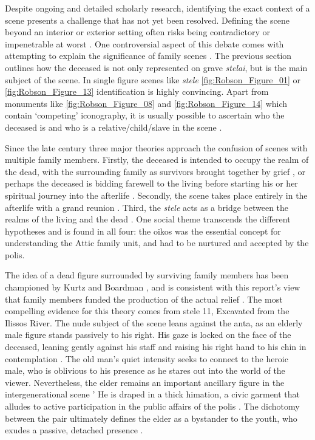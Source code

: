 
Despite ongoing and detailed scholarly research, identifying the exact context of a scene presents a challenge that has not yet been resolved. Defining the scene beyond an interior or exterior setting often risks being contradictory or impenetrable at worst \parencite[53]{Friis1951}.
One controversial aspect of this debate comes with attempting to explain the significance of family scenes \parencite[26]{Stears2000a}.
The previous section outlines how the deceased is not only represented on grave \textit{stelai}, but is the main subject of the scene. In single figure scenes like \textit{stele} \ref{fig:Robson_Figure_01} or \ref{fig:Robson_Figure_13} identification is highly convincing.
Apart from monuments like \ref{fig:Robson_Figure_08} and \ref{fig:Robson_Figure_14} which contain \enquote*{competing} iconography, it is usually possible to ascertain who the deceased is and who is a relative/child/slave in the scene \parencite[175]{Frel1973}.

Since the late  century three major theories approach the confusion of scenes with multiple family members. Firstly, the deceased is intended to occupy the realm of the dead, with the surrounding family as survivors brought together by grief \parencite[116]{Boardman1995},
or perhaps the deceased is bidding farewell to the living before starting his or her spiritual journey into the afterlife \parencite[116]{Boardman1995}.
Secondly, the scene takes place entirely in the afterlife with a grand reunion \parencite[247]{Mee2011}.
Third, the \textit{stele} acts as a bridge between the realms of the living and the dead \parencite[198]{Wasserman1969}. One social theme transcends the different hypotheses and is found in all four: the oikos was the essential concept for understanding the Attic family unit, and had to be nurtured and accepted by the polis.

The idea of a dead figure surrounded by surviving family members has been championed by Kurtz and Boardman \parencite[140]{Kurtz1971},
and is consistent with this report’s view that family members funded the production of the actual relief \parencite[96]{Wrenhaven2012}.
The most compelling evidence for this theory comes from stele 11, Excavated from the Ilissos River. The nude subject of the scene leans against the anta, as an elderly male figure stands passively to his right. His gaze is locked on the face of the deceased, leaning gently against his staff and raising his right hand to his chin in contemplation \parencite[141]{Kurtz1971}.
The old man’s quiet intensity seeks to connect to the heroic male, who is oblivious to his presence as he stares out into the world of the viewer. Nevertheless, the elder remains an important ancillary figure in the intergenerational scene ' He is draped in a thick himation, a civic garment that alludes to active participation in the public affairs of the polis \parencite[20]{Hallett2005}.
The dichotomy between the pair ultimately defines the elder as a bystander to the youth, who exudes a passive, detached presence \parencite[145]{Palagia2006}.

